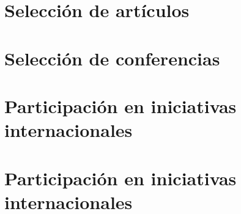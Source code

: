\documentclass[a4paper,final,11pt,fleqn,twoside]{book}  %
\begin{document}
\section{Selección de artículos}
\section{Selección de conferencias}
\section{Participación en iniciativas internacionales}
\section{Participación en iniciativas internacionales}


\backmatter


\printindex
\printglossaries


\insertbibliography
\end{document}
